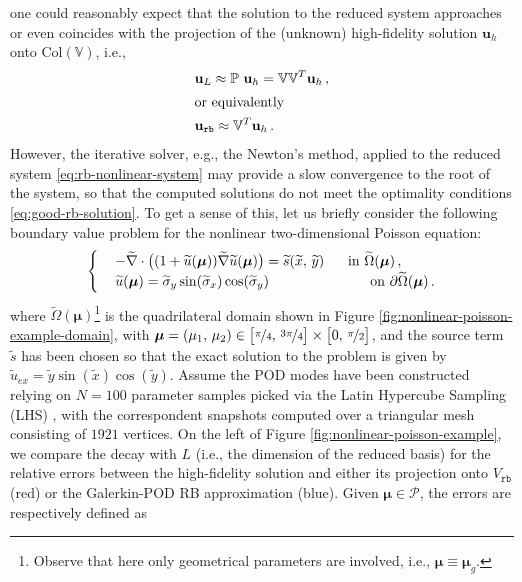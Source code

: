 \documentclass[12pt, a4paper, twoside, openright]{report}
\numberwithin{equation}{chapter}
\theoremstyle{theorem}
\theoremstyle{definition}
\theoremstyle{remark}
\theoremstyle{proposition}
\numberwithin{figure}{chapter}
\newcommand{\wt}[1]{\widetilde{#1}}
\newcommand{\bg}[1]{\boldsymbol{#1}}
\begin{document}
		one could reasonably expect that the solution to the reduced system approaches or even coincides with the projection of the (unknown) high-fidelity solution $\mathbf{u}_h$ onto $\text{Col}(\mathbb{V})$, i.e., 
		\begin{subequations}
			\label{eq:good-rb-solution}
			\begin{align}
				& \mathbf{u}_L \approx \mathbb{P} ~ \mathbf{u}_h = \mathbb{V} \mathbb{V}^T \mathbf{u}_h \, , \\
				\intertext{or equivalently}
				& \mathbf{u}_{\texttt{rb}} \approx \mathbb{V}^T \mathbf{u}_h \, .
			\end{align}
		\end{subequations}
		However, the iterative solver, e.g., the Newton's method, applied to the reduced system \eqref{eq:rb-nonlinear-system} may provide a slow convergence to the root of the system, so that the computed solutions do not meet the optimality conditions \eqref{eq:good-rb-solution}. To get a sense of this, let us briefly consider the following boundary value problem for the nonlinear two-dimensional Poisson equation:
		\begin{equation}
			\label{eq:nonlinear-poisson-example}
			\begin{cases}
				& - \wt{\nabla} \cdot \big( (1 + \wt{u}(\bg{\mu})) \wt{\nabla} \wt{u}(\bg{\mu}) \big) = \wt{s}(\wt{x}, \, \wt{y}) \hspace*{0.6cm} \text{in $\wt{\Omega}(\boldsymbol{\mu})$} \, , \\
				& \wt{u}(\bg{\mu}) = \wt{\sigma}_y \sin(\wt{\sigma}_x) \cos(\wt{\sigma}_y) \hspace*{2.55cm} \text{on $\partial \wt{\Omega}(\boldsymbol{\mu})$} \, .
			\end{cases}
		\end{equation}
		where $\wt{\Omega}(\boldsymbol{\mu})$\footnote{Observe that here only geometrical parameters are involved, i.e., $\bg{\mu} \equiv \bg{\mu}_g$.} is the quadrilateral domain shown in Figure \ref{fig:nonlinear-poisson-example-domain}, with $\bg{\mu} = (\mu_1, \, \mu_2) \in \big[ \nicefrac{\pi}{4}, \, \nicefrac{3 \pi}{4} \big] \times \big[ 0, \, \nicefrac{\pi}{2} \big]$, and the source term $\wt{s}$ has been chosen so that the exact solution to the problem is given by $\wt{u}_{ex} = \wt{y} \sin(\wt{x}) \cos(\wt{y})$. Assume the POD modes have been constructed relying on $N = 100$ parameter samples picked via the Latin Hypercube Sampling (LHS) \cite{Imam08}, with the correspondent snapshots computed over a triangular mesh consisting of $1921$ vertices. On the left of Figure \ref{fig:nonlinear-poisson-example}, we compare the decay with $L$ (i.e., the dimension of the reduced basis) for the relative errors between the high-fidelity solution and either its projection onto $V_{\texttt{rb}}$ (red) or the Galerkin-POD RB approximation (blue). Given $\bg{\mu} \in \mathcal{P}$, the errors are respectively defined as
\end{document}
